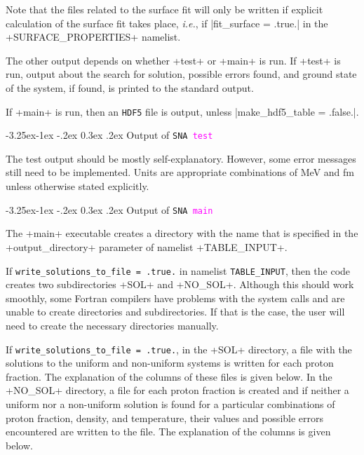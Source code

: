 \documentclass[letterpaper,11pt]{refart}
\makeatletter
\renewcommand\subsubsection{\@startsection{subsubsection}{3}{\z@}%
                           {-3.25ex\@plus -1ex \@minus -.2ex}%
                           {0.3ex \@plus .2ex}%
                           {\normalfont\normalsize\bf\fontsize{11}{13}\selectfont}}
\makeatother
\begin{document}
Note that the files related to the surface fit will only be written if
explicit calculation of the surface fit takes place, \textit{i.e.}, if
\verbprm|fit_surface = .true.| in the \verbnml+SURFACE_PROPERTIES+
namelist.


The other output depends on whether \verbexec+test+ or \verbexec+main+
is run.  If \verbexec+test+ is run, output about the search for
solution, possible errors found, and ground state of the system, if
found, is printed to the standard output.

If \verbexec+main+ is run, then an \verb|HDF5| file is output, unless 
\verbprm|make_hdf5_table = .false.|. 




\subsubsection{Output of \texttt{SNA \textcolor{magenta}{test}}}\label{sssec:SNA_test_out}


The test output should be mostly self-explanatory.  However, some
error messages still need to be implemented.  Units are appropriate
combinations of MeV and fm unless otherwise stated explicitly.



\subsubsection{Output of \texttt{SNA \textcolor{magenta}{main}}}\label{sssec:SNA_main_out}


The \verbexec+main+ executable creates a directory with the name that
is specified in the \verbprm+output_directory+ parameter of namelist
\verbnml+TABLE_INPUT+.

If \texttt{\color{ForestGreen}write\_solutions\_to\_file = .true.} in
namelist \texttt{\color{cyan}TABLE\_INPUT}, then the code creates two
subdirectories \verbfile+SOL+ and \verbfile+NO_SOL+.  Although this
should work smoothly, some Fortran compilers have problems with the
system calls and are unable to create directories and subdirectories.
If that is the case, the user will need to create the necessary
directories manually. 

If \texttt{\color{ForestGreen}write\_solutions\_to\_file = .true.}, in
the \verbfile+SOL+ directory, a file with the solutions to the uniform
and non-uniform systems is written for each proton fraction. The
explanation of the columns of these files is given below.  In the
\verbfile+NO_SOL+ directory, a file for each proton fraction is
created and if neither a uniform nor a non-uniform solution is found
for a particular combinations of proton fraction, density, and
temperature, their values and possible errors encountered are written
to the file. The explanation of the columns is given below.
\end{document}
